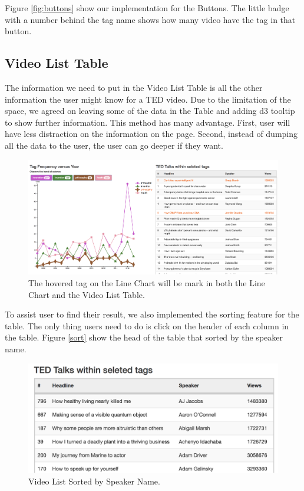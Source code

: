 \documentclass{report}
\numberwithin{figure}{section}
\begin{document}
Figure \ref{fig:buttons} show our implementation for the Buttons. The little badge with a number behind the tag name shows how many video have the tag in that button.




\subsection{Video List Table}
\quad The information we need to put in the Video List Table is all the other information the user might know for a TED video. Due to the limitation of the space, we agreed on leaving some of the data in the Table and adding d3 tooltip to show further information. This method has many advantage. First, user will have less distraction on the information on the page. Second, instead of dumping all the data to the user, the user can go deeper if they want.

\begin{figure}
\begin{center}
\includegraphics[scale=0.3]{changecolor}
\caption{The hovered tag on the Line Chart will be mark in both the Line Chart and the Video List Table.}
\label{fig:changecolor}
\end{center}
\end{figure} 


To assist user to find their result, we also implemented the sorting feature for the table. The only thing users need to do is click on the header of each column in the table. Figure \ref{sort} show the head of the table that sorted by the speaker name.

\begin{figure}
\begin{center}
\includegraphics[scale=0.6]{sort}
\caption{Video List Sorted by Speaker Name.}
\label{fig:sort}
\end{center}
\end{figure}
\end{document}
